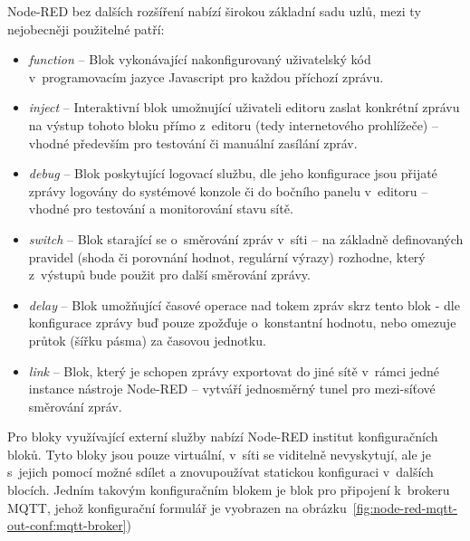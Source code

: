 Node-RED bez dalších rozšíření nabízí širokou základní sadu uzlů, mezi ty nejobecněji použitelné patří:

\begin{itemize}
    \item\emph{function} -- Blok vykonávající nakonfigurovaný uživatelský kód v~programovacím jazyce Javascript pro
    každou příchozí zprávu.
    \item\emph{inject} -- Interaktivní blok umožnující uživateli editoru zaslat konkrétní zprávu na výstup tohoto bloku
    přímo z~editoru (tedy internetového prohlížeče) -- vhodné především pro testování či manuální zasílání zpráv.
    \item\emph{debug} -- Blok poskytující logovací službu, dle jeho konfigurace jsou přijaté zprávy logovány do systémové konzole či do
    bočního panelu v~editoru -- vhodné pro testování a monitorování stavu sítě.
    \item\emph{switch} -- Blok starající se o~směrování zpráv v~síti -- na základně definovaných pravidel
    (shoda či porovnání hodnot, regulární výrazy) rozhodne, který z~výstupů bude použit pro další směrování zprávy.
    \item\emph{delay} -- Blok umožňující časové operace nad tokem zpráv skrz tento blok - dle konfigurace zprávy buď
    pouze zpožďuje o~konstantní hodnotu, nebo omezuje průtok (šířku pásma) za časovou jednotku.
    \item\emph{link} -- Blok, který je schopen zprávy exportovat do jiné sítě v~rámci jedné instance nástroje
    Node-RED -- vytváří jednosměrný tunel pro mezi-síťové směrování zpráv.
\end{itemize}

Pro bloky využívající externí služby nabízí Node-RED institut konfiguračních bloků.
Tyto bloky jsou pouze virtuální, v~síti se viditelně nevyskytují, ale je
s~jejich pomocí možné sdílet a znovupoužívat statickou konfiguraci v~dalších blocích.
Jedním takovým konfiguračním blokem je blok pro připojení k~brokeru MQTT, jehož konfigurační formulář je vyobrazen na
obrázku~\ref{fig:node-red-mqtt-out-conf:mqtt-broker})

